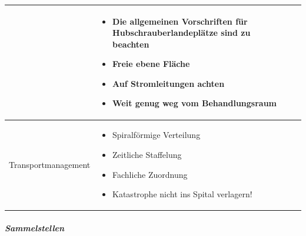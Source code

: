 \documentclass{article}
\begin{document}
\begin{center}
\begin{supertabular}{|m{2.365cm}m{5.8640003cm}m{4.8710003cm}|}
 &
\begin{itemize}
\item Die allgemeinen Vorschriften f\"ur Hubschrauberlandepl\"atze sind
zu beachten

\item Freie ebene Fl\"ache 

\item Auf Stromleitungen achten

\item Weit genug weg vom Behandlungsraum 

\end{itemize}
 &
\par

\\\hline
Transport\-management

 &
\begin{itemize}
\item Spiralf\"ormige Verteilung

\item Zeitliche Staffelung

\item Fachliche Zuordnung

\item Katastrophe nicht ins Spital verlagern!

\end{itemize}
 &
 \par

\\\hline
\end{supertabular}
\end{center}
\subparagraph{Sammelstellen}
\end{document}
